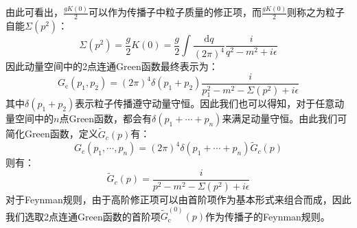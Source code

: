 由此可看出，$\frac{gK(0)}{2}$可以作为传播子中粒子质量的修正项，而$\frac{gK(0)}{2}$则称之为粒子自能$\Sigma(p^2)$：
\begin{equation}
\Sigma(p^2)=\frac{g}{2}K(0)=\frac{g}{2}\int\frac{\mathrm{d}q}{(2\pi)^4}\frac{i}{q^2-m^2+i\epsilon}
\end{equation}
因此动量空间中的2点连通Green函数最终表示为：
\begin{equation}
G_{\text{c}}(p_1,p_2)=(2\pi)^4\delta(p_1+p_2)\frac{i}{p_1^2-m^2-\Sigma(p^2)+i\epsilon}
\end{equation}
其中$\delta(p_1+p_2)$表示粒子传播遵守动量守恒。因此我们也可以得知，对于任意动量空间中的$n$点Green函数，都会有$\delta(p_1+\cdots+p_n)$来满足动量守恒。由此我们可简化Green函数，定义$\tilde{G}_c(p)$有：
\begin{equation}
G_c(p_1,\cdots,p_n)=(2\pi)^4\delta(p_1+\cdots+p_n)\tilde{G}_c(p)
\end{equation}
则有：
\begin{equation}
\tilde{G}_c(p)=\frac{i}{p^2-m^2-\Sigma(p^2)+i\epsilon}
\end{equation}
对于Feynman规则，由于高阶修正项可以由首阶项作为基本形式来组合而成，因此我们选取2点连通Green函数的首阶项$\tilde{G}^{(0)}_{\text{c}}(p)$作为传播子的Feynman规则。

